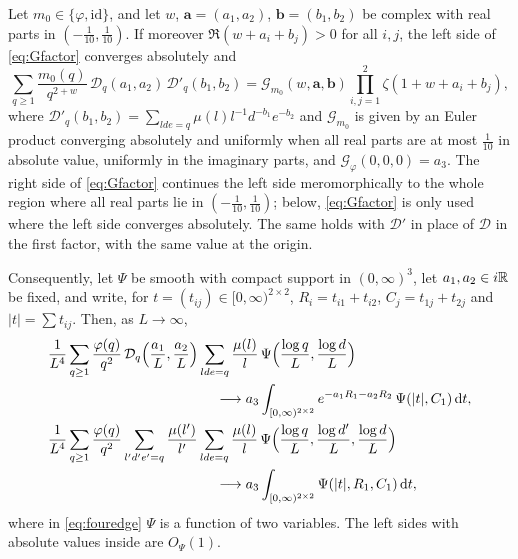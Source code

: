 \documentclass[11pt,colorlinks]{charlie}
\begin{document}
\begin{lemma}\label{lem:fouredge}
Let $m_0\in\{\varphi,\mathrm{id}\}$, and let $w$, $\boldsymbol a=(a_1,a_2)$, $\boldsymbol b=(b_1,b_2)$ be complex with real parts in $(-\frac1{10},\frac1{10})$. If moreover $\Re(w+a_i+b_j)>0$ for all $i,j$, the left side of \eqref{eq:Gfactor} converges absolutely and
\begin{equation}\label{eq:Gfactor}
 \sum_{q\ge1}\frac{m_0(q)}{q^{2+w}}\,\mathcal D_q(a_1,a_2)\,\mathcal D'_q(b_1,b_2)=\mathcal G_{m_0}(w,\boldsymbol a,\boldsymbol b)\prod_{i,j=1}^2\zeta(1+w+a_i+b_j),
\end{equation}
where $\mathcal D'_q(b_1,b_2)=\sum_{lde=q}\mu(l)l^{-1}d^{-b_1}e^{-b_2}$ and $\mathcal G_{m_0}$ is given by an Euler product converging absolutely and uniformly when all real parts are at most $\frac1{10}$ in absolute value, uniformly in the imaginary parts, and $\mathcal G_\varphi(0,0,0)=a_3$. The right side of \eqref{eq:Gfactor} continues the left side meromorphically to the whole region where all real parts lie in $(-\frac1{10},\frac1{10})$; below, \eqref{eq:Gfactor} is only used where the left side converges absolutely. The same holds with $\mathcal D'$ in place of $\mathcal D$ in the first factor, with the same value at the origin.

Consequently, let $\Psi$ be smooth with compact support in $(0,\infty)^3$, let $a_1,a_2\in i\mathbb{R}$ be fixed, and write, for $t=(t_{ij})\in[0,\infty)^{2\times2}$, $R_i=t_{i1}+t_{i2}$, $C_j=t_{1j}+t_{2j}$ and $|t|=\sum t_{ij}$. Then, as $L\to\infty$,
\begin{align}
 &\frac1{L^4}\sum_{q\ge1}\frac{\varphi(q)}{q^2}\,\mathcal D_q\Big(\frac{a_1}L,\frac{a_2}L\Big)\sum_{lde=q}\frac{\mu(l)}l\,\Psi\Big(\frac{\log q}L,\frac{\log d}L\Big)\notag\\
 &\hspace{12em}\longrightarrow a_3\int_{[0,\infty)^{2\times2}}e^{-a_1R_1-a_2R_2}\,\Psi(|t|,C_1)\dd t,\label{eq:fouredge}\\
 &\frac1{L^4}\sum_{q\ge1}\frac{\varphi(q)}{q^2}\sum_{l'd'e'=q}\frac{\mu(l')}{l'}\sum_{lde=q}\frac{\mu(l)}l\,\Psi\Big(\frac{\log q}L,\frac{\log d'}L,\frac{\log d}L\Big)\notag\\
 &\hspace{12em}\longrightarrow a_3\int_{[0,\infty)^{2\times2}}\Psi(|t|,R_1,C_1)\dd t,\label{eq:fouredge2}
\end{align}
where in \eqref{eq:fouredge} $\Psi$ is a function of two variables. The left sides with absolute values inside are $O_\Psi(1)$.
\end{lemma}
\end{document}
